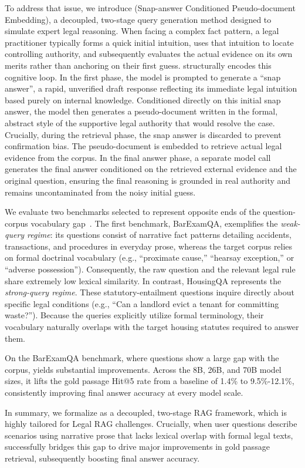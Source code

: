 To address that issue, we introduce \hyre{} (Snap-answer Conditioned Pseudo-document Embedding), a decoupled, two-stage query generation method designed to simulate expert legal reasoning. When facing a complex fact pattern, a legal practitioner typically forms a quick initial intuition, uses that intuition to locate controlling authority, and subsequently evaluates the actual evidence on its own merits rather than anchoring on their first guess. \hyre{} structurally encodes this cognitive loop. In the first phase, the model is prompted to generate a ``snap answer'', a rapid, unverified draft response reflecting its immediate legal intuition based purely on internal knowledge. Conditioned directly on this initial snap answer, the model then generates a pseudo-document written in the formal, abstract style of the supportive legal authority that would resolve the case. Crucially, during the retrieval phase, the snap answer is discarded to prevent confirmation bias. The pseudo-document is embedded to retrieve actual legal evidence from the corpus. In the final answer phase, a separate model call generates the final answer conditioned on the retrieved external evidence and the original question, ensuring the final reasoning is grounded in real authority and remains uncontaminated from the noisy initial guess.

We evaluate two benchmarks selected to represent opposite ends of the question-corpus vocabulary gap~\cite{Zheng_2025}. The first benchmark, BarExamQA, exemplifies the \textit{weak-query regime}: its questions consist of narrative fact patterns detailing accidents, transactions, and procedures in everyday prose, whereas the target corpus relies on formal doctrinal vocabulary (e.g., ``proximate cause,'' ``hearsay exception,'' or ``adverse possession''). Consequently, the raw question and the relevant legal rule share extremely low lexical similarity. In contrast, HousingQA represents the \textit{strong-query regime}. These statutory-entailment questions inquire directly about specific legal conditions (e.g., ``Can a landlord evict a tenant for committing waste?''). Because the queries explicitly utilize formal terminology, their vocabulary naturally overlaps with the target housing statutes required to answer them.

On the BarExamQA benchmark, where questions show a large gap with the corpus, \hyre{} yields substantial improvements. Across the 8B, 26B, and 70B model sizes, it lifts the gold passage Hit@5 rate from a baseline of 1.4\% to 9.5\%-12.1\%, consistently improving final answer accuracy at every model scale.

In summary, we formalize \hyre{} as a decoupled, two-stage RAG framework, which is highly tailored for Legal RAG challenges. Crucially, when user questions describe scenarios using narrative prose that lacks lexical overlap with formal legal texts, \hyre{} successfully bridges this gap to drive major improvements in gold passage retrieval, subsequently boosting final answer accuracy.
